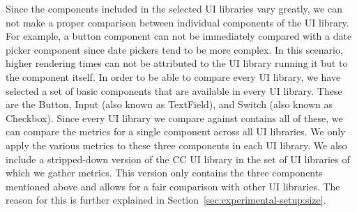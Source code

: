 Since the components included in the selected UI libraries vary greatly, we can not make a proper comparison between individual components of the UI library. For example, a button component can not be immediately compared with a date picker component since date pickers tend to be more complex. In this scenario, higher rendering times can not be attributed to the UI library running it but to the component itself. In order to be able to compare every UI library, we have selected a set of basic components that are available in every UI library. These are the Button, Input (also known as TextField), and Switch (also known as Checkbox). Since every UI library we compare against contains all of these, we can compare the metrics for a single component across all UI libraries. We only apply the various metrics to these three components in each UI library. We also include a stripped-down version of the CC UI library in the set of UI libraries of which we gather metrics. This version only contains the three components mentioned above and allows for a fair comparison with other UI libraries. The reason for this is further explained in Section~\ref{sec:experimental-setup:size}.

